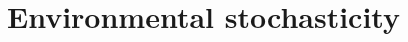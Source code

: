 \documentclass[color=usenames,dvipsnames]{beamer}\usepackage[]{graphicx}\usepackage[]{xcolor}
\begin{document}
\section{Environmental stochasticity}





\end{document}
